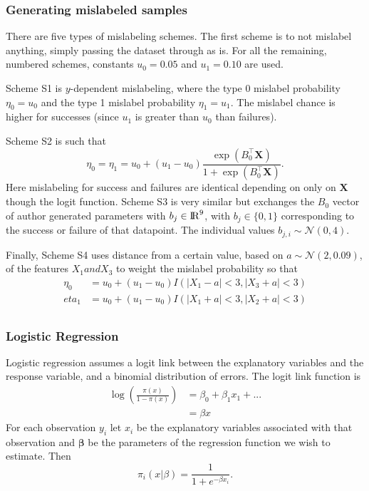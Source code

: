 \documentclass{article}
\begin{document}
\subsubsection*{Generating mislabeled samples}

There are five types of mislabeling schemes. The first scheme is to not mislabel anything, simply passing the dataset through as is. For all the remaining, numbered schemes, constants $u_0 = 0.05$ and $u_1 = 0.10$ are used.

Scheme S1 is $y$-dependent mislabeling, where the type 0 mislabel probability $\eta_0 = u_0$ and the type 1 mislabel probability $\eta_1 = u_1$. The mislabel chance is higher for successes (since $u_1$ is greater than $u_0$ than failures). 

Scheme S2 is such that $$\eta_0 = \eta_1 = u_0 + \left(u_1 - u_0\right)\frac{\exp(B_0^\top\mathbf{X})}{1+\exp(B_0^{\top}\mathbf{X})}. $$ Here mislabeling for success and failures are identical depending on only on $\mathbf{X}$ though the logit function. Scheme S3 is very similar but exchanges the $B_0$ vector of author generated parameters with $b_j \in {\rm I\!R}^9$, with $b_j\in \{0, 1\}$ corresponding to the success or failure of that datapoint. The individual values $b_{j,i} \sim \mathcal{N}(0, 4)$. 

Finally, Scheme S4 uses distance from a certain value, based on $a \sim \mathcal{N}(2, 0.09)$, of the features $X_1 and X_3$ to weight the mislabel probability so that 
\begin{align*}
\eta_0 &= u_0 + \left(u_1-u_0\right)I\left(\left|X_1 - a\right| < 3,\left|X_3 + a\right| < 3\right)\\
eta_1 &= u_0 + \left(u_1-u_0\right)I\left(\left|X_1 + a\right| < 3,\left|X_2 + a\right| < 3\right)\\
\end{align*}


\subsubsection*{Logistic Regression}
Logistic regression assumes a logit link between the explanatory variables and the response variable, and a binomial distribution of errors. The logit link function is 
\begin{align*}
\log\left(\frac{\pi(x)}{1-\pi(x)}\right) &= \beta_0 + \beta_1x_1 + ... \\
&= \beta x
\end{align*}
For each observation $y_i$ let $x_i$ be the explanatory variables associated with that observation and $\boldsymbol{\beta}$ be the parameters of the regression function we wish to estimate. Then 
$$\pi_i(x|\beta) = \frac{1}{1+e^{-\beta x_i}}.$$
\end{document}
